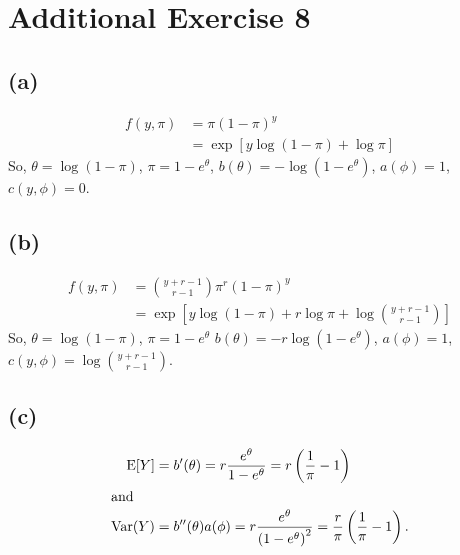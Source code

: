 \section*{Additional Exercise 8}
\subsection*{(a)}
\begin{align*}
f(y,\pi) & = \pi(1-\pi)^{y}  \\
         & = \exp\left[y \log(1-\pi) + \log\pi\right]
\end{align*}
So, $\theta = \log(1-\pi)$, $\pi = 1-e^{\theta}$, $b(\theta) = -\log\left(1-e^{\theta}\right)$, $a(\phi) = 1$, $c(y,\phi) = 0$.

\subsection*{(b)}
\begin{align*}
f(y,\pi) & = \binom{y+r-1}{r-1}\pi^{r}(1-\pi)^{y} \\ 
         & = \exp\left[y \log(1-\pi) + r\log\pi + \log\binom{y+r-1}{r-1}\right]
\end{align*}
So, $\theta = \log(1-\pi)$, $\pi = 1 -e^{\theta}$ $b(\theta) =-r\log\left(1-e^{\theta}\right)$, $a(\phi) = 1$, $c(y,\phi) = \log\binom{y+r-1}{r-1}$.\\

\subsection*{(c)}
\begin{align*}
\mathrm{E}[Y] &= b'(\theta) = r\frac{e^{\theta}}{1-e^{\theta}} = r\left(\frac{1}{\pi}-1\right)\\ \intertext{and}
\mathrm{Var}(Y) &= b''(\theta) a(\phi) = r\frac{e^{\theta}}{\left(1-e^{\theta}\right)^2} = \frac{r}{\pi}\left(\frac{1}{\pi}-1\right).
\end{align*}